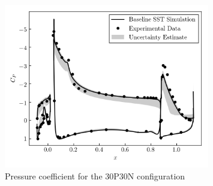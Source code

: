 \begin{figure}
\center
\includegraphics[width=0.8\textwidth]{suthesis/images/30p30n_5p5aoa_cp.png}
\caption{Pressure coefficient for the 30P30N configuration\label{fig:30p30n}}
\end{figure}